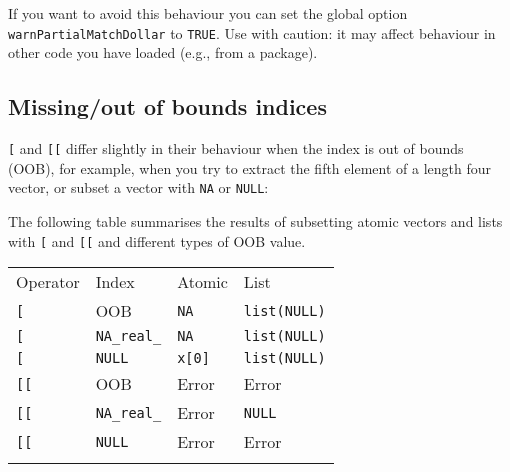 If you want to avoid this behaviour you can set the global option
\texttt{warnPartialMatchDollar} to \texttt{TRUE}. Use with caution: it
may affect behaviour in other code you have loaded (e.g., from a
package).

\subsection{Missing/out of bounds indices}

\texttt{{[}} and \texttt{{[}{[}} differ slightly in their behaviour when
the index is out of bounds (OOB), for example, when you try to extract
the fifth element of a length four vector, or subset a vector with
\texttt{NA} or \texttt{NULL}: 

\begin{Shaded}
\begin{Highlighting}[]
\StringTok{ }\NormalTok{:}
\NormalTok{(x[}\NormalTok{])}
\NormalTok{(x[}\NormalTok{])}
\NormalTok{(x[}\NormalTok{])}
\end{Highlighting}
\end{Shaded}

The following table summarises the results of subsetting atomic vectors
and lists with \texttt{{[}} and \texttt{{[}{[}} and different types of
OOB value.

\begin{longtable}[c]{@{}llll@{}}
\toprule\addlinespace
Operator & Index & Atomic & List
\\\addlinespace
\midrule\endhead
\texttt{{[}} & OOB & \texttt{NA} & \texttt{list(NULL)}
\\\addlinespace
\texttt{{[}} & \texttt{NA\_real\_} & \texttt{NA} & \texttt{list(NULL)}
\\\addlinespace
\texttt{{[}} & \texttt{NULL} & \texttt{x{[}0{]}} & \texttt{list(NULL)}
\\\addlinespace
\texttt{{[}{[}} & OOB & Error & Error
\\\addlinespace
\texttt{{[}{[}} & \texttt{NA\_real\_} & Error & \texttt{NULL}
\\\addlinespace
\texttt{{[}{[}} & \texttt{NULL} & Error & Error
\\\addlinespace
\bottomrule
\end{longtable}

